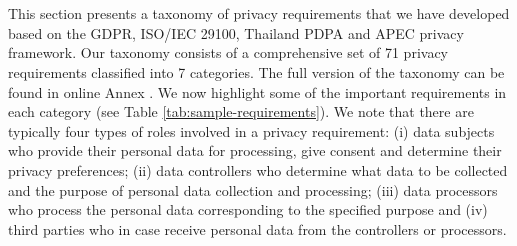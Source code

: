 \section{} \label{sec:taxonomy}

This section presents a taxonomy of privacy requirements that we have developed based on the GDPR, ISO/IEC 29100, Thailand PDPA and APEC privacy framework. Our taxonomy consists of a comprehensive set of 71 privacy requirements classified into 7 categories. The full version of the taxonomy can be found in online Annex \cite{reppkg-pridp}. We now highlight some of the important requirements in each category (see Table \ref{tab:sample-requirements}). We note that there are typically four types of roles involved in a privacy requirement: (i) data subjects who provide their personal data for processing, give consent and determine their privacy preferences; (ii) data controllers who determine what data to be collected and the purpose of personal data collection and processing; (iii) data processors who process the personal data corresponding to the specified purpose and (iv) third parties who in case receive personal data from the controllers or processors.

\vspace{-4mm}

